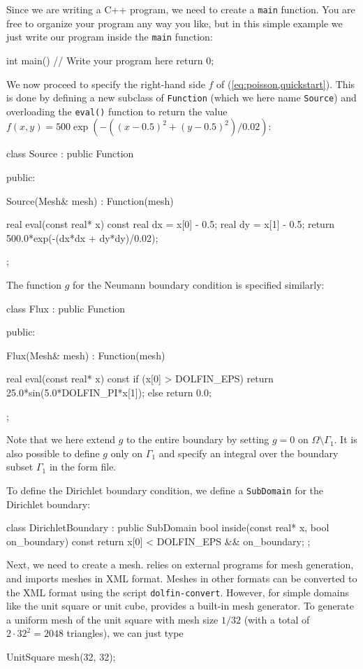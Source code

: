 Since we are writing a C++ program, we need to create a \texttt{main}
function.  You are free to organize your program any way you like, but
in this simple example we just write our program inside the
\texttt{main} function:

\begin{code}
int main()
{
  // Write your program here
  return 0;
}
\end{code}

We now proceed to specify the right-hand side $f$ of
(\ref{eq:poisson,quickstart}). This is done by defining a new subclass
of \texttt{Function} (which we here name \texttt{Source}) and
overloading the \texttt{eval()} function to return the value $f(x, y)
= 500 \exp(-((x-0.5)^2 + (y-0.5)^2)/0.02)$:
\begin{code}
class Source : public Function
{
public:
    
  Source(Mesh& mesh) : Function(mesh) {}

  real eval(const real* x) const
  {
    real dx = x[0] - 0.5;
    real dy = x[1] - 0.5;
    return 500.0*exp(-(dx*dx + dy*dy)/0.02);
  }

};
\end{code}

The function $g$ for the Neumann boundary condition is specified
similarly:
\begin{code}
class Flux : public Function
{
public:

  Flux(Mesh& mesh) : Function(mesh) {}

  real eval(const real* x) const
  {
    if (x[0] > DOLFIN_EPS)
      return 25.0*sin(5.0*DOLFIN_PI*x[1]);
    else
      return 0.0;
  }

};
\end{code}

Note that we here extend $g$ to the entire boundary by setting $g = 0$
on $\Omega \setminus \Gamma_1$. It is also possible to define $g$ only
on $\Gamma_1$ and specify an integral over the boundary subset
$\Gamma_1$ in the form file.

To define the Dirichlet boundary condition, we define a
\texttt{SubDomain} for the Dirichlet boundary:
\begin{code}
class DirichletBoundary : public SubDomain
{
  bool inside(const real* x, bool on_boundary) const
  {
    return x[0] < DOLFIN_EPS && on_boundary;
  }
};
\end{code}

Next, we need to create a mesh. \dolfin{} relies on external programs
for mesh generation, and imports meshes in \dolfin{} XML
format. Meshes in other formats can be converted to the \dolfin{} XML
format using the script \texttt{dolfin-convert}. However, for simple
domains like the unit square or unit cube, \dolfin{} provides a
built-in mesh generator. To generate a uniform mesh of the unit square
with mesh size $1/32$ (with a total of $2\cdot 32^2 = 2048$
triangles), we can just type
\begin{code}
UnitSquare mesh(32, 32);
\end{code}

